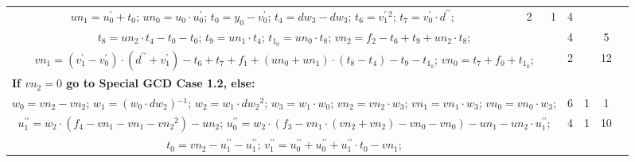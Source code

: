\begin{tabular}{|c|cr|c|c|c|c|}
{$un_1=u^{\prime}_0+t_0$;\hspace{4pt}
$un_0=u_0 \cdot u^{\prime}_0$;\hspace{4pt}
$t_0=y_0-v^{\prime}_0$;\hspace{4pt}
$t_4=dw_3-dw_3$;\hspace{4pt}
$t_6=v^{\prime}_1{}^{2}$;\hspace{4pt}
$t_7=v^{\prime}_0 \cdot d^{\prime\prime}$;\hspace{4pt}
} & 2 & 1 & 4 & \\
\multicolumn{3}{|R{340pt}|}{ 
$t_8=un_2 \cdot t_4-t_0-t_0$;\hspace{4pt}
$t_9=un_1 \cdot t_4$;\hspace{4pt}
$t_1_0=un_0 \cdot t_8$;\hspace{4pt}
$vn_2=f_2-t_6+t_9+un_2 \cdot t_8$;\hspace{4pt}
} & 4 &  & 5 & \\
\multicolumn{3}{|R{340pt}|}{ 
$vn_1=(v^{\prime}_1-v^{\prime}_0) \cdot (d^{\prime\prime}+v^{\prime}_1)-t_6+t_7+f_1+(un_0+un_1) \cdot (t_8-t_4)-t_9-t_1_0$;\hspace{4pt}
$vn_0=t_7+f_0+t_1_0$;\hspace{4pt}
} & 2 &  & 12 & \\
\multicolumn{3}{|l|}{ 
 \bf{If $vn_2 = 0$ go to Special GCD Case 1.2, else:} } &  &  &  & \\
\multicolumn{3}{|R{340pt}|}{ 
$w_0=vn_2-vn_2$;\hspace{4pt}
$w_1=(w_0 \cdot dw_2){}^{-1}$;\hspace{4pt}
$w_2=w_1 \cdot dw_2{}^{2}$;\hspace{4pt}
$w_3=w_1 \cdot w_0$;\hspace{4pt}
$vn_2=vn_2 \cdot w_3$;\hspace{4pt}
$vn_1=vn_1 \cdot w_3$;\hspace{4pt}
$vn_0=vn_0 \cdot w_3$;\hspace{4pt}
} & 6 & 1 & 1 & \\
\multicolumn{3}{|R{340pt}|}{ 
$u^{\prime\prime}_1=w_2 \cdot (f_4-vn_1-vn_1-vn_2{}^{2})-un_2$;\hspace{4pt}
$u^{\prime\prime}_0=w_2 \cdot (f_3-vn_1 \cdot (vn_2+vn_2)-vn_0-vn_0)-un_1-un_2 \cdot u^{\prime\prime}_1$;\hspace{4pt}
} & 4 & 1 & 10 & \\
\multicolumn{3}{|R{340pt}|}{ 
$t_0=vn_2-u^{\prime\prime}_1-u^{\prime\prime}_1$;\hspace{4pt}
$v^{\prime\prime}_1=u^{\prime\prime}_0+u^{\prime\prime}_0+u^{\prime\prime}_1 \cdot t_0-vn_1$;\hspace{4pt}
}
\end{tabular}
